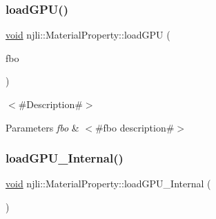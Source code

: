 \subsubsection{\texorpdfstring{load\+G\+P\+U()}{loadGPU()}\hspace{0.1cm}{\footnotesize\ttfamily [4/4]}}
{\footnotesize\ttfamily \mbox{\hyperlink{_thread_8h_af1e856da2e658414cb2456cb6f7ebc66}{void}} njli\+::\+Material\+Property\+::load\+G\+PU (\begin{DoxyParamCaption}\item[{\mbox{\hyperlink{classnjli_1_1_abstract_frame_buffer_object}{Abstract\+Frame\+Buffer\+Object}} $\ast$}]{fbo }\end{DoxyParamCaption})}

$<$\#\+Description\#$>$


\begin{DoxyParams}{Parameters}
{\em fbo} & $<$\#fbo description\#$>$ \\
\hline
\end{DoxyParams}
\mbox{\label{classnjli_1_1_material_property_a9952072ad753a049bf653dc55a7089b0}} 
\subsubsection{\texorpdfstring{load\+G\+P\+U\+\_\+\+Internal()}{loadGPU\_Internal()}\hspace{0.1cm}{\footnotesize\ttfamily [1/4]}}
{\footnotesize\ttfamily \mbox{\hyperlink{_thread_8h_af1e856da2e658414cb2456cb6f7ebc66}{void}} njli\+::\+Material\+Property\+::load\+G\+P\+U\+\_\+\+Internal (\begin{DoxyParamCaption}{ }\end{DoxyParamCaption})\hspace{0.3cm}{\ttfamily [private]}}

\mbox{\label{classnjli_1_1_material_property_a2279e0f7abdce078f62c121520cac369}} 
